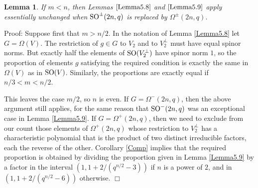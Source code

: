 \documentclass[12pt]{article}
\newtheorem{lemma}[definition]{Lemma}
\newenvironment{proof}{\normalsize {\sc Proof}:}{{\hfill $\Box$ \\}}
\def\SO{{\rm SO}}
\begin{document}
\begin{lemma}\label{Omega}  
If $m < n$, then 
Lemmas $\ref{Lemma5.8}$ and $\ref{Lemma5.9}$ 
apply essentially unchanged when $\SO^{\pm}(2n, q)$
is replaced by $\Omega^{\pm}(2n,q)$.
\end{lemma}
\begin{proof}  
Suppose first that $m>n/2$.
In the notation of Lemma \ref{Lemma5.8} let $G=\Omega(V)$.  The restriction
of $g\in G$ to $V_2$ and to $V_2^\perp$ must have equal spinor norms.
But exactly half the elements of $\SO(V_2^\perp)$ have spinor norm $1$,
so the proportion of elements $g$ satisfying the required condition is
exactly the same in $\Omega(V)$ as in $\SO(V)$.
Similarly, the proportions are exactly equal if $n/3<m<n/2$.  

This leaves the case $m/2$, so $n$ is even.
If $G = \Omega^-(2n, q)$, then 
the above argument still applies, for the same
reason that $\SO^{-}(2n, q)$ was an exceptional
case in Lemma \ref{Lemma5.9}.
If $G = \Omega^+(2n,q)$, then 
we need to exclude from our count those elements of 
$\Omega^+(2n,q)$ whose restriction
to $V_2^\perp$ has a characteristic polynomial that is 
the product of two distinct irreducible factors,
each the reverse of the other.  
Corollary \ref{Comp} implies that the required
proportion is obtained by dividing 
the proportion given in Lemma \ref{Lemma5.9} by 
a factor in 
the interval $(1, 1+2/(q^{n/2}-3))$ if $n$ is a power of $2$,
and in $(1, 1+2/(q^{n/2}-6))$ otherwise.
\end{proof}
\end{document}
